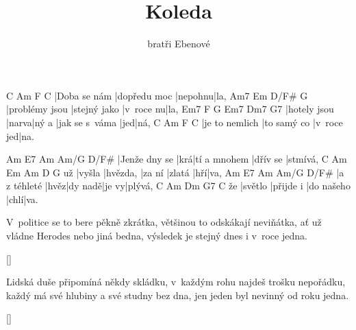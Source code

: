 \documentclass{song}
\author{bratři Ebenové}
\title{Koleda}
\begin{document}
\strophe
C            Am           F       C
|Doba se nám |dopředu moc |nepohnu|la,
Am7            Em           D/F\#     G
|problémy jsou |stejný jako |v~roce nu|la,
Em7          F     G     Em7            Dm7 G7
|hotely jsou |narva|ný a |jak se s~váma |jed|ná,
C              Am          F          C
|je to nemlich |to samý co |v~roce jed|na.
\endstrophe

Am            E7  Am           Am/G     D/F\#
|Jenže dny se |krá|tí a mnohem |dřív se |stmívá,
   C      Am       Em     Am     D   G
už |vyšla |hvězda, |za ní |zlatá |hří|va,
Am           E7   Am      Am/G  D/F\#
|a z téhleté |hvěz|dy nadě|je vy|plývá,
   C       Am        Dm         G7   C
že |světlo |přijde i |do našeho |chlí|va.
\endstrophe

\strophe*
V~politice se to bere pěkně zkrátka,
většinou to odskákají neviňátka,
ať už vládne Herodes nebo jiná bedna,
výsledek je stejný dnes i v~roce jedna.
\endstrophe

\ref{}

\strophe*
Lidská duše připomíná někdy skládku,
v~každým rohu najdeš trošku nepořádku,
každý má své hlubiny a své studny bez dna,
jen jeden byl nevinný od roku jedna.
\endstrophe

\ref{}
\end{document}
